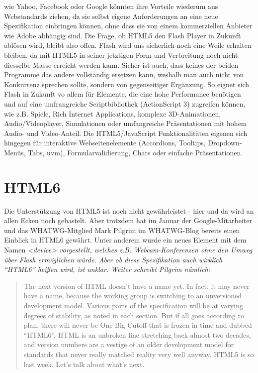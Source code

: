 wie Yahoo, Facebook oder Google könnten ihre Vorteile wiederum
aus Webstandards ziehen, da sie selbst eigene Anforderungen an eine
neue Spezifikation einbringen können, ohne dass sie von einem
kommerziellen Anbieter wie Adobe abhängig sind.
\newline\newline
Die Frage, ob HTML5 den Flash Player in Zukunft ablösen wird, bleibt also offen.
Flash wird uns sicherlich noch eine Weile erhalten bleiben, da mit HTML5
in seiner jetztigen Form und Verbreitung noch nicht diesselbe Masse
erreicht werden kann. Sicher ist auch, dass keines der beiden Programme
das andere vollständig ersetzen kann, weshalb man auch nicht von
Konkurrenz sprechen sollte, sondern von gegenseitiger Ergänzung.
\newline\newline
So eignet sich Flash in Zukunft vo allem für Elemente, die eine hohe Performance
benötigen und auf eine umfrangreiche Scriptbibliothek (ActionScript 3)
zugreifen können, wie z.B. Spiele, Rich Internet Applications, komplexe
3D-Animationen, Audio/Videoplayer, Simulationen oder umfangreiche
Präsentationen mit hohem Audio- und Video-Anteil. Die HTML5/JavaScript
Funktionalitäten eigenen sich hingegen für interaktive Webseitenelemente
(Accordions, Tooltips, Dropdown-Menüs, Tabs, uvm), Formularvalidierung,
Chats oder einfache Präsentationen.

\section{HTML6}

Die Unterstützung von HTML5 ist noch nicht gewährleistet - hier und da wird
an allen Ecken noch gebastelt. Aber trotzdem hat im Januar der
Google-Mitarbeiter und das WHATWG-Mitglied Mark Pilgrim im WHATWG-Blog
bereits einen Einblick in HTML6 gewährt. Unter anderem wurde ein neues
Element mit dem Namen \em{<device>} vorgestellt, welches z.B.
Webcam-Konferenzen ohne den Umweg über Flash ermöglichen würde.
Aber ob diese Spezifikation auch wirklich "`HTML6"' heißen wird, ist unklar.
Weiter schreibt Pilgrim nämlich:

\begin{quote}
	The next version of HTML doesn't have a name yet. In fact,
	it may never have a name, because the working group is
	switching to an unversioned development model. Various
	parts of the specification will be at varying degrees of
	stability, as noted in each section. But if all goes according
	to plan, there will never be One Big Cutoff that is frozen in
	time and dubbed "`HTML6"'. HTML is an unbroken line
	stretching back almost two decades, and version numbers
	are a vestige of an older development model for standards
	that never really matched reality very well anyway.
	HTML5 is so last week. Let's talk about what's next.
\end{quote}

